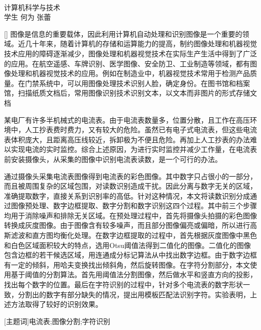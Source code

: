 \begin{center}
\vspace*{18pt}
{\heiti{}\thesistitle}\\[18pt]
\quad 计算机科学与技术\\[12pt]
{\kaishu 学生} \quad 何为  \quad 张蕾\\[24pt]
\end{center}\par

[{}]
图像是信息的重要载体，因此利用计算机自动处理和识别图像是一个重要的领域。近几十年来，随着计算机的存储和运算能力的提高，制约图像处理和机器视觉技术应用的障碍逐渐减少，图像处理和机器视觉技术在实际生产生活中得到了广泛的应用。在航空遥感、车牌识别、医学图像、安全防卫、工业制造等领域，都有图像处理和机器视觉技术的应用。例如在制造业中，机器视觉技术常用于检测产品质量。在门禁系统中，可以用图像处理技术识别人脸，确定身份。在图书馆和档案馆，扫描纸质文档后，常用图像识别技术识别文本，以文本而非图片的形式存储文档

某电厂有许多半机械式的电流表。由于电流表数量多，位置分散，且工作在高压环境中，人工抄表费时费力，又有较大的危险。虽然已有电子式电流表，但这些电流表体积庞大，且距离高压线较近，拆卸极为不便且危险。再加上人工抄表的办法难以实现电流的实时监控。综合上述原因，为进行实时监控并减少工作量，在电流表前安装摄像头，从采集的图像中识别电流表读数，是一个可行的办法。

通过摄像头采集电流表图像得到电流表的彩色图像。其中数字只占很小的一部分，而且被周围复杂的区域包围，对读数识别造成干扰。因此分离与数字无关的区域，准确提取数字，直接关系到识别率的高低。针对这种情况，本文将读数识别分成通过图像预处理、数字边框提取、数字分割和数字识别这四个过程。其中前三个步骤均用于消除噪声和排除无关区域。在预处理过程中，首先将摄像头拍摄的彩色图像转换成灰度图像。由于图像含有较多噪声，而且部分图像偏亮或偏暗，所以进行高斯滤波和直方图均衡化处理。在数字边框提取的过程中，首先根据灰度图像中黑色和白色区域面积较大的特点，选用Otsu阈值法得到二值化的图像。二值化的图像包含边框的若干候选区域，用连通成分标记算法从中找出数字边框。由于数字边框有一定的倾斜，用哈夫变换找出倾斜角，然后旋转图像。在字符分割部分，本文使用基于阈值的分割算法。首先用阈值法分割图像，然后做水平和竖直方向的投影，找出每个数字的位置。最后在字符识别的过程中，针对多个电流表的数字形状一致，分割出的数字有部分缺失的情况，提出用模板匹配法识别字符。实验表明，上述方法取得了较好的识别效果。

\vspace{10pt}

[{\heiti 主题词}]{\kaishu 电流表;\quad 图像分割;\quad 字符识别}

